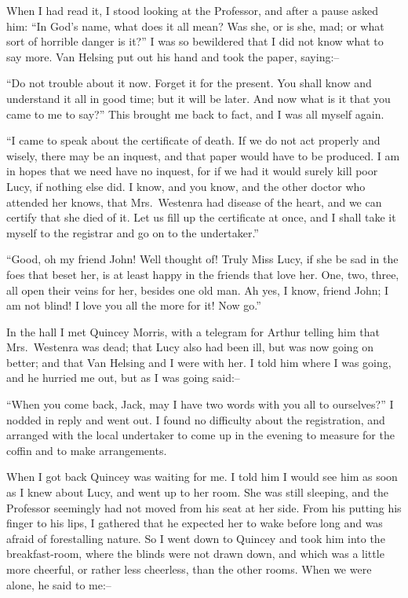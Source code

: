 \documentclass[12pt,openright]{book}
\begin{document}
When I had read it, I stood looking at the Professor, and after a pause asked him: “In God’s name, what does it all mean? Was she, or is she, mad; or what sort of horrible danger is it?” I was so bewildered that I did not know what to say more. Van Helsing put out his hand and took the paper, saying:–

“Do not trouble about it now. Forget it for the present. You shall know and understand it all in good time; but it will be later. And now what is it that you came to me to say?” This brought me back to fact, and I was all myself again.

“I came to speak about the certificate of death. If we do not act properly and wisely, there may be an inquest, and that paper would have to be produced. I am in hopes that we need have no inquest, for if we had it would surely kill poor Lucy, if nothing else did. I know, and you know, and the other doctor who attended her knows, that Mrs. Westenra had disease of the heart, and we can certify that she died of it. Let us fill up the certificate at once, and I shall take it myself to the registrar and go on to the undertaker.”

“Good, oh my friend John! Well thought of! Truly Miss Lucy, if she be sad in the foes that beset her, is at least happy in the friends that love her. One, two, three, all open their veins for her, besides one old man. Ah yes, I know, friend John; I am not blind! I love you all the more for it! Now go.”

In the hall I met Quincey Morris, with a telegram for Arthur telling him that Mrs. Westenra was dead; that Lucy also had been ill, but was now going on better; and that Van Helsing and I were with her. I told him where I was going, and he hurried me out, but as I was going said:–

“When you come back, Jack, may I have two words with you all to ourselves?” I nodded in reply and went out. I found no difficulty about the registration, and arranged with the local undertaker to come up in the evening to measure for the coffin and to make arrangements.

When I got back Quincey was waiting for me. I told him I would see him as soon as I knew about Lucy, and went up to her room. She was still sleeping, and the Professor seemingly had not moved from his seat at her side. From his putting his finger to his lips, I gathered that he expected her to wake before long and was afraid of forestalling nature. So I went down to Quincey and took him into the breakfast-room, where the blinds were not drawn down, and which was a little more cheerful, or rather less cheerless, than the other rooms. When we were alone, he said to me:–
\end{document}

